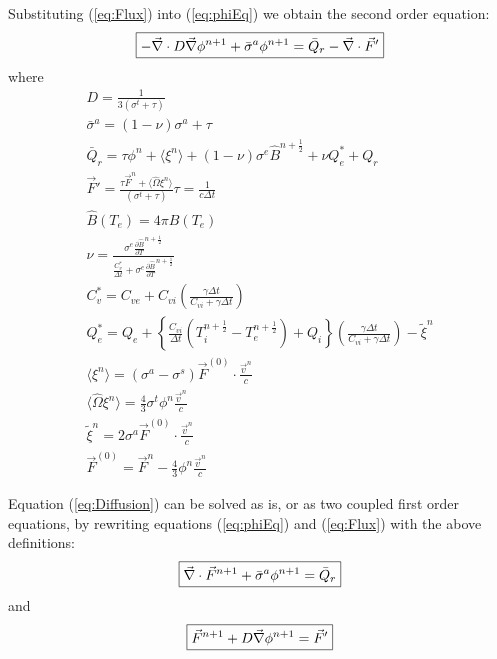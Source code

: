 \documentclass[12pt]{article}
\newcommand{\dt}{\ensuremath{\Delta t}}
\newcommand{\cviOdt}{\ensuremath{\frac{C_{vi}}{\dt}}}
\newcommand{\Cvs}{\ensuremath{C_{v}^{*}}}
\newcommand{\Bnphlf}{\ensuremath{\hat{B}^{n+\frac{1}{2}}}}
\newcommand{\pBnphlfdT}{\ensuremath{\frac{\partial\hat{B}}{\partial T}^{n+\frac{1}{2}}}}
\begin{document}
Substituting (\ref{eq:Flux}) into (\ref{eq:phiEq}) we obtain
the second order equation:
\begin{equation}
   \boxed{
         - \vec{\nabla} \cdot D \vec{\nabla} \phi^{n+1} +  \bar{\sigma}^{a} \phi^{n+1}
                = \bar{Q}_{r} - \vec{\nabla} \cdot \vec{F}'
         }
\label{eq:Diffusion}
\end{equation}
where
\begin{gather}
        D = \frac{1}{3(\sigma^{t} + \tau) } 
  \label{eq:quant_i}
  \\
        \bar{\sigma}^{a} = (1 - \nu) \sigma^{a} + \tau 
  \\
        \bar{Q}_{r} =\tau \phi^{n}
                + \langle \xi^{n} \rangle
                + (1 - \nu) \sigma^{e} \Bnphlf  + \nu Q_{e}^{*} + Q_{r}
  \\
        \vec{F}' = \frac{\tau \vec{F}^{n}
                        + \langle \hat{\Omega} \xi^{n} \rangle}
               {(\sigma^{t} + \tau)}
        \tau = \frac{1}{c\dt}
  \\
        \hat{B}(T_{e}) = 4\pi B(T_{e})
  \\
        \nu = \frac{\sigma^{e} \pBnphlfdT } {\frac{\Cvs}{\dt} + \sigma^{e}\pBnphlfdT}
  \\
        \Cvs = C_{ve} + C_{vi} \left(\frac{\gamma\dt}{C_{vi}+\gamma\dt}\right)
  \\
        Q_{e}^{*} = Q_{e} + \left\{ \cviOdt (T_{i}^{n+\frac{1}{2}} - T_{e}^{n+\frac{1}{2}}) +
                                Q_{i} \right\}
                \left(\frac{\gamma\dt}{C_{vi}+\gamma\dt}\right) -
                \tilde{\xi}^{n}
  \\
        \langle \xi^{n} \rangle =
                        (\sigma^{a} - \sigma^{s}) \vec{F}^{(0)}
                        \cdot \frac{\vec{v}^{n}}{c}
  \\
        \langle \hat{\Omega} \xi^{n} \rangle =
                \frac{4}{3} \sigma^{t} \phi^{n} \frac{\vec{v}^{n}}{c}
  \\
        \tilde{\xi}^{n} = 2 \sigma^{a} \vec{F}^{(0)} \cdot
                                \frac{\vec{v}^{n}}{c}
  \\
        \vec{F}^{(0)} = \vec{F}^{n} - \frac{4}{3} \phi^{n}
                                                \frac{\vec{v}^{n}}{c}
  \label{eq:quant_f}
\end{gather}

Equation (\ref{eq:Diffusion}) can be solved as is,
or as two coupled first order equations,
by rewriting equations (\ref{eq:phiEq}) and (\ref{eq:Flux}) with the above
definitions:
\begin{equation}
   \boxed{
        \vec{\nabla} \cdot \vec{F}^{n+1} + \bar{\sigma}^{a} \phi^{n+1}
                = \bar{Q}_{r}
         }
\label{eq:phi2}
\end{equation}
and
\begin{equation}
   \boxed{
        \vec{F}^{n+1} + D \vec{\nabla} \phi^{n+1} =  \vec{F}'
         }
\label{eq:Flux2}
\end{equation}
\end{document}

